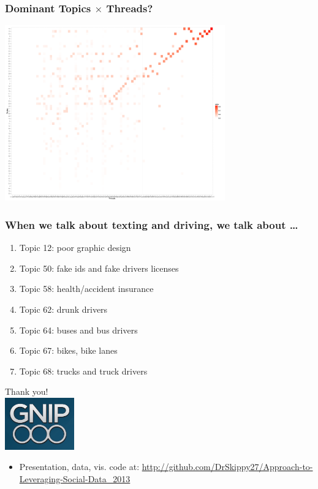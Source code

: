 \documentclass{beamer}
\begin{document}
\begin{frame}\frametitle{Dominant Topics $\times$ Threads?}
  \begin{center}
    \includegraphics[width=9.5cm]{./imgs/DT_gg_heat.pdf}
  \end{center}
\end{frame}

\begin{frame}\frametitle{When we talk about texting and driving, we talk about \ldots}
\begin{center}
{\Large 
\begin{enumerate}
\item Topic 12: poor graphic design
\item Topic 50: fake ids and fake drivers licenses
\item Topic 58: health/accident insurance
\item Topic 62: drunk drivers
\item Topic 64: buses and bus drivers
\item Topic 67: bikes, bike lanes
\item Topic 68: trucks and truck drivers
\end{enumerate}
}
\end{center}
\end{frame}

\begin{frame}
  \begin{center}
    {\Large Thank you!}  \\ [20pt]
    \includegraphics[width=3cm]{./imgs/logo.png} \\ [15pt]
    \begin{itemize}
    \item Presentation, data, vis. code at: \url{http://github.com/DrSkippy27/Approach-to-Leveraging-Social-Data_2013}
    \end{itemize}
  \end{center}
\end{frame}
\end{document}
